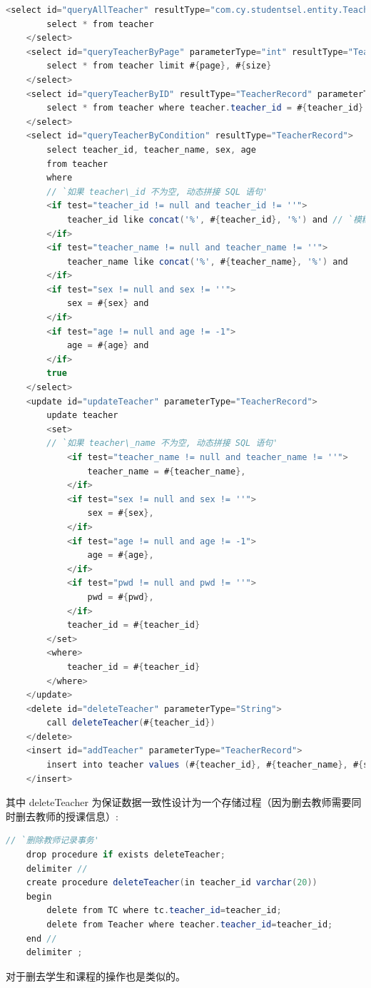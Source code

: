 \documentclass[12pt, a4paper]{article}
\begin{document}
\begin{lstlisting}[language = Java]
    <select id="queryAllTeacher" resultType="com.cy.studentsel.entity.TeacherRecord">
        select * from teacher
    </select>
    <select id="queryTeacherByPage" parameterType="int" resultType="TeacherRecord">
        select * from teacher limit #{page}, #{size}
    </select>
    <select id="queryTeacherByID" resultType="TeacherRecord" parameterType="String">
        select * from teacher where teacher.teacher_id = #{teacher_id}
    </select>
    <select id="queryTeacherByCondition" resultType="TeacherRecord">
        select teacher_id, teacher_name, sex, age
        from teacher
        where
		// `如果 teacher\_id 不为空, 动态拼接 SQL 语句'
        <if test="teacher_id != null and teacher_id != ''">
            teacher_id like concat('%', #{teacher_id}, '%') and // `模糊查询'
        </if>
        <if test="teacher_name != null and teacher_name != ''">
            teacher_name like concat('%', #{teacher_name}, '%') and
        </if>
        <if test="sex != null and sex != ''">
            sex = #{sex} and
        </if>
        <if test="age != null and age != -1">
            age = #{age} and
        </if>
        true
    </select>
    <update id="updateTeacher" parameterType="TeacherRecord">
        update teacher
        <set>
		// `如果 teacher\_name 不为空, 动态拼接 SQL 语句'
            <if test="teacher_name != null and teacher_name != ''"> 
                teacher_name = #{teacher_name},
            </if>
            <if test="sex != null and sex != ''">
                sex = #{sex},
            </if>
            <if test="age != null and age != -1">
                age = #{age},
            </if>
            <if test="pwd != null and pwd != ''">
                pwd = #{pwd},
            </if>
            teacher_id = #{teacher_id}
        </set>
        <where>
            teacher_id = #{teacher_id}
        </where>
    </update>
    <delete id="deleteTeacher" parameterType="String">
        call deleteTeacher(#{teacher_id})
    </delete>
    <insert id="addTeacher" parameterType="TeacherRecord">
        insert into teacher values (#{teacher_id}, #{teacher_name}, #{sex}, #{age}, #{pwd})
    </insert>
\end{lstlisting}

其中 deleteTeacher 为保证数据一致性设计为一个存储过程（因为删去教师需要同时删去教师的授课信息）:
\begin{lstlisting}[language = Java]
	// `删除教师记录事务'
	drop procedure if exists deleteTeacher;
	delimiter //
	create procedure deleteTeacher(in teacher_id varchar(20))
	begin
		delete from TC where tc.teacher_id=teacher_id;
		delete from Teacher where teacher.teacher_id=teacher_id;
	end //
	delimiter ;
\end{lstlisting}
对于删去学生和课程的操作也是类似的。
\end{document}
